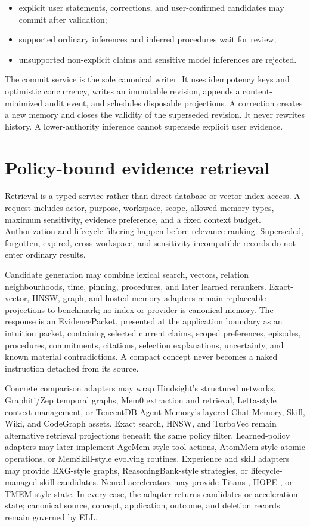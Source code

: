 \documentclass[
  english,
  a4paper,
  DIV=11,
  numbers=noendperiod]{scrreprt}
\providecommand{\tightlist}{%
  \setlength{\itemsep}{0pt}\setlength{\parskip}{0pt}}
\begin{document}
\begin{itemize}
\tightlist
\item
  explicit user statements, corrections, and user-confirmed candidates
  may commit after validation;
\item
  supported ordinary inferences and inferred procedures wait for review;
\item
  unsupported non-explicit claims and sensitive model inferences are
  rejected.
\end{itemize}

The commit service is the sole canonical writer. It uses idempotency
keys and optimistic concurrency, writes an immutable revision, appends a
content-minimized audit event, and schedules disposable projections. A
correction creates a new memory and closes the validity of the
superseded revision. It never rewrites history. A lower-authority
inference cannot supersede explicit user evidence.

\section{Policy-bound evidence
retrieval}\label{policy-bound-evidence-retrieval}

Retrieval is a typed service rather than direct database or vector-index
access. A request includes actor, purpose, workspace, scope, allowed
memory types, maximum sensitivity, evidence preference, and a fixed
context budget. Authorization and lifecycle filtering happen before
relevance ranking. Superseded, forgotten, expired, cross-workspace, and
sensitivity-incompatible records do not enter ordinary results.

Candidate generation may combine lexical search, vectors, relation
neighbourhoods, time, pinning, procedures, and later learned rerankers.
Exact-vector, HNSW, graph, and hosted memory adapters remain replaceable
projections to benchmark; no index or provider is canonical memory. The
response is an EvidencePacket, presented at the application boundary as
an intuition packet, containing selected current claims, scoped
preferences, episodes, procedures, commitments, citations, selection
explanations, uncertainty, and known material contradictions. A compact
concept never becomes a naked instruction detached from its source.

Concrete comparison adapters may wrap Hindsight's structured networks,
Graphiti/Zep temporal graphs, Mem0 extraction and retrieval, Letta-style
context management, or TencentDB Agent Memory's layered Chat Memory,
Skill, Wiki, and CodeGraph assets. Exact search, HNSW, and TurboVec
remain alternative retrieval projections beneath the same policy filter.
Learned-policy adapters may later implement AgeMem-style tool actions,
AtomMem-style atomic operations, or MemSkill-style evolving routines.
Experience and skill adapters may provide EXG-style graphs,
ReasoningBank-style strategies, or lifecycle-managed skill candidates.
Neural accelerators may provide Titans-, HOPE-, or TMEM-style state. In
every case, the adapter returns candidates or acceleration state;
canonical source, concept, application, outcome, and deletion records
remain governed by ELL.
\end{document}
